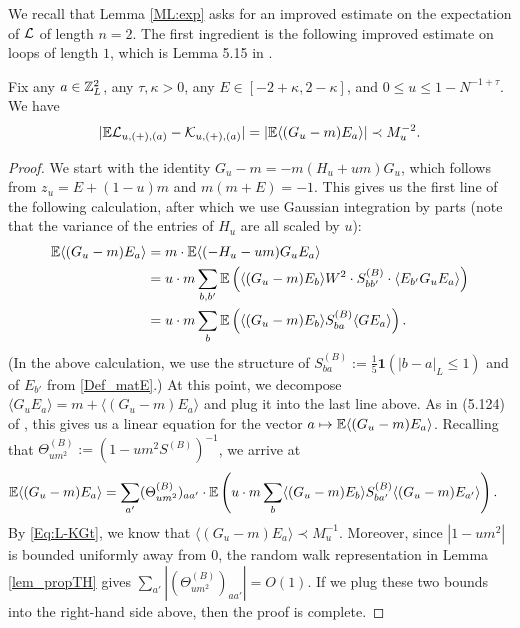  We recall that Lemma \ref{ML:exp} asks for an improved estimate on the expectation of ${\cal L}$ of length $n=2$. The first ingredient is the following improved estimate on loops of length $1$, which is Lemma 5.15 in \cite{YY_25}.
 \begin{lemma}\label{lemma:step6-1}
Fix any $a\in\mathbb{Z}_{L}^{2}$, any $\tau,\kappa>0$, any $E\in[-2+\kappa,2-\kappa]$, and $0\leq u\leq 1-N^{-1+\tau}$. We have 
%
\begin{align}
|\mathbb{E}{\cal L}_{u,(+),(a)}-{\cal K}_{u,(+),(a)}|=|\mathbb{E}\langle(G_{u}-m)E_{a}\rangle|\prec M_{u}^{-2}.
\end{align}
%
\end{lemma}
\begin{proof}
We start with the identity $G_{u}-m=-m(H_{u}+um)G_{u}$, which follows from $z_{u}=E+(1-u)m$ and $m(m+E)=-1$. This gives us the first line of the following calculation, after which we use Gaussian integration by parts (note that the variance of the entries of $H_{u}$ are all scaled by $u$):
%
\begin{align*}
\mathbb{E}\langle(G_{u}-m)E_{a}\rangle&=m\cdot\mathbb{E}\langle(-H_{u}-um)G_{u}E_{a}\rangle\\
&=u\cdot m\sum_{b,b'}\mathbb{E}\left(\langle(G_{u}-m)E_{b}\rangle W^{2}\cdot S^{(B)}_{bb'}\cdot \langle E_{b'}G_{u}E_{a}\rangle\right)\\
&=u\cdot m\sum_{b}\mathbb{E}\left(\langle(G_{u}-m)E_{b}\rangle S^{(B)}_{ba}\langle GE_{a}\rangle\right).
\end{align*}
%
(In the above calculation, we use the structure of $S^{(B)}_{ba}:=\frac15\mathbf{1}(|b-a|_{L}\leq1)$ and of $E_{b'}$ from \eqref{Def_matE}.) At this point, we decompose $\langle G_{u}E_{a}\rangle=m+\langle(G_{u}-m)E_{a}\rangle$ and plug it into the last line above. As in (5.124) of \cite{YY_25}, this gives us a linear equation for the vector $a\mapsto\mathbb{E}\langle(G_{u}-m)E_{a}\rangle$. Recalling that $\Theta^{(B)}_{um^{2}}:=(1-um^{2}S^{(B)})^{-1}$, we arrive at
%
\begin{align*}
\mathbb{E}\langle(G_{u}-m)E_{a}\rangle&=\sum_{a'}(\Theta^{(B)}_{um^{2}})_{aa'}\cdot\mathbb{E}\left(u\cdot m\sum_{b}\langle(G_{u}-m)E_{b}\rangle S^{(B)}_{ba'}\langle(G_{u}-m)E_{a'}\rangle\right).
\end{align*}
%
By \eqref{Eq:L-KGt}, we know that $\langle(G_{u}-m)E_{a}\rangle\prec M_{u}^{-1}$. Moreover, since $|1-um^{2}|$ is bounded uniformly away from $0$, the random walk representation in Lemma \ref{lem_propTH} gives $\sum_{a'}|(\Theta^{(B)}_{um^{2}})_{aa'}|=O(1)$. If we plug these two bounds into the right-hand side above, then the proof is complete.
\end{proof}
